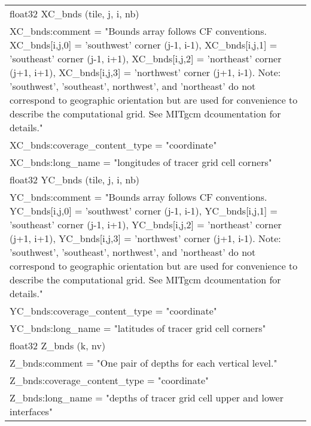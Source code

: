 \begin{longtable}{|p{\textwidth}|}
\rowcolor{Apricot}\hspace{0.5cm}float32 XC\_bnds (tile, j, i, nb)\\
\rowcolor{Apricot}\hspace{0.5cm}\hspace{0.5cm}XC\_bnds:comment = "Bounds array follows CF conventions. XC\_bnds[i,j,0] = 'southwest' corner (j-1, i-1), XC\_bnds[i,j,1] = 'southeast' corner (j-1, i+1), XC\_bnds[i,j,2] = 'northeast' corner (j+1, i+1), XC\_bnds[i,j,3]  = 'northwest' corner (j+1, i-1). Note: 'southwest', 'southeast', northwest', and 'northeast' do not correspond to geographic orientation but are used for convenience to describe the computational grid. See MITgcm dcoumentation for details."\\
\rowcolor{Apricot}\hspace{0.5cm}\hspace{0.5cm}XC\_bnds:coverage\_content\_type = "coordinate"\\
\rowcolor{Apricot}\hspace{0.5cm}\hspace{0.5cm}XC\_bnds:long\_name = "longitudes of tracer grid cell corners"\\
\rowcolor{Apricot}\hspace{0.5cm}float32 YC\_bnds (tile, j, i, nb)\\
\rowcolor{Apricot}\hspace{0.5cm}\hspace{0.5cm}YC\_bnds:comment = "Bounds array follows CF conventions. YC\_bnds[i,j,0] = 'southwest' corner (j-1, i-1), YC\_bnds[i,j,1] = 'southeast' corner (j-1, i+1), YC\_bnds[i,j,2] = 'northeast' corner (j+1, i+1), YC\_bnds[i,j,3]  = 'northwest' corner (j+1, i-1). Note: 'southwest', 'southeast', northwest', and 'northeast' do not correspond to geographic orientation but are used for convenience to describe the computational grid. See MITgcm dcoumentation for details."\\
\rowcolor{Apricot}\hspace{0.5cm}\hspace{0.5cm}YC\_bnds:coverage\_content\_type = "coordinate"\\
\rowcolor{Apricot}\hspace{0.5cm}\hspace{0.5cm}YC\_bnds:long\_name = "latitudes of tracer grid cell corners"\\
\rowcolor{Apricot}\hspace{0.5cm}float32 Z\_bnds (k, nv)\\
\rowcolor{Apricot}\hspace{0.5cm}\hspace{0.5cm}Z\_bnds:comment = "One pair of depths for each vertical level."\\
\rowcolor{Apricot}\hspace{0.5cm}\hspace{0.5cm}Z\_bnds:coverage\_content\_type = "coordinate"\\
\rowcolor{Apricot}\hspace{0.5cm}\hspace{0.5cm}Z\_bnds:long\_name = "depths of tracer grid cell upper and lower interfaces"\\
\hline


\end{longtable}
